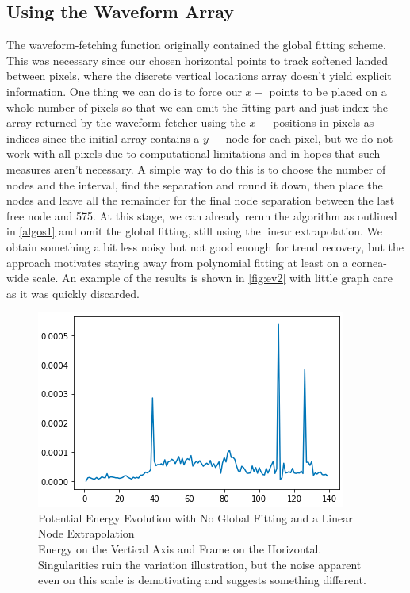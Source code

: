 \documentclass[epjST]{svjour}
\begin{document}
\subsection{Using the Waveform Array}
The waveform-fetching function originally contained the global fitting scheme. This was necessary since our chosen horizontal points to track softened landed between pixels, where the discrete vertical locations array doesn't yield explicit information. One thing we can do is to force our $x-$ points to be placed on a whole number of pixels so that we can omit the fitting part and just index the array returned by the waveform fetcher using the $x-$ positions in pixels as indices since the initial array contains a $y-$ node for each pixel, but we do not work with all pixels due to computational limitations and in hopes that such measures aren't necessary. A simple way to do this is to choose the number of nodes and the interval, find the separation and round it down, then place the nodes and leave all the remainder for the final node separation between the last free node and 575. At this stage, we can already rerun the algorithm as outlined in \autoref{algos1} and omit the global fitting, still using the linear extrapolation. We obtain something a bit less noisy but not good enough for trend recovery, but the approach motivates staying away from polynomial fitting at least on a cornea-wide scale. An example of the results is shown in \autoref{fig:ev2} with little graph care as it was quickly discarded.
\begin{figure}[h]
    \centering
    \includegraphics[width=0.5\linewidth]{figures/minimization2/app2.png}
    \caption{Potential Energy Evolution with No Global Fitting and a Linear Node Extrapolation\\
    Energy on the Vertical Axis and Frame on the Horizontal. Singularities ruin the variation illustration, but the noise apparent even on this scale is demotivating and suggests something different.}
    \label{fig:ev2}
\end{figure}
\end{document}
